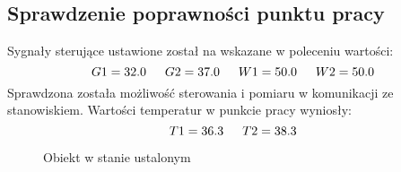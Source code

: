 \subsection{Sprawdzenie poprawności punktu pracy}
\label{lab:zad1}

Sygnały sterujące ustawione został na wskazane w poleceniu wartości:
$$G1 = \num{32.0}  \indent G2 = \num{37.0}  \indent W1 = \num{50.0}  \indent W2 = \num{50.0}$$
Sprawdzona została możliwość sterowania i pomiaru w komunikacji ze stanowiskiem. 
Wartości temperatur w punkcie pracy wyniosły:
$$T1 = \num{36,3} \indent T2 = \num{38,3}$$

\ifdefined\CompileFigures
   \begin{figure}[H] 
      \centering
      
      \caption{Obiekt w stanie ustalonym}
      \label{lab:zad1:figure:setpoint}
   \end{figure}
\fi


\newpage
